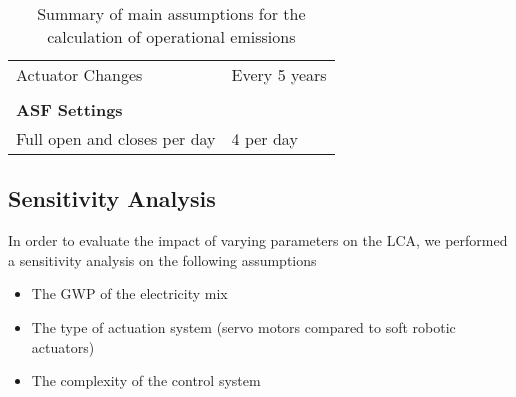 \begin{description}
\begin{table}[H]
\begin{tabular}{ll}
Actuator Changes              & Every 5 years                                  \\
                              &                                                \\
\textbf{ASF Settings}         &                                                \\
Full open and closes per day  & 4 per day                                      \\
\hline
\end{tabular}
\caption{Summary of main assumptions for the calculation of operational emissions}
\label{tab:AssumptionsOpp}
\end{table}


\end{description}



\subsection{Sensitivity Analysis}

In order to evaluate the impact of varying parameters on the LCA, we performed a sensitivity analysis on the following assumptions
\begin{itemize}
\item The GWP of the electricity mix
\item The type of actuation system (servo motors compared to soft robotic actuators)
\item The complexity of the control system
\end{itemize}


